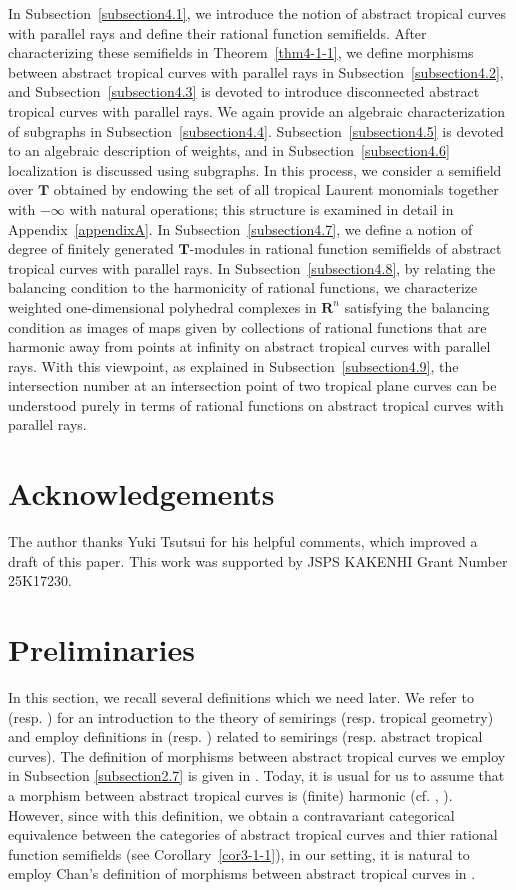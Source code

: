 \documentclass[a4paper,12pt]{amsart}
\begin{document}
In Subsection~\ref{subsection4.1}, we introduce the notion of abstract tropical curves with parallel rays and define their rational function semifields.
After characterizing these semifields in Theorem~\ref{thm4-1-1}, we define morphisms between abstract tropical curves with parallel rays in Subsection~\ref{subsection4.2}, and Subsection~\ref{subsection4.3} is devoted to introduce disconnected abstract tropical curves with parallel rays.
We again provide an algebraic characterization of subgraphs in Subsection~\ref{subsection4.4}.
Subsection~\ref{subsection4.5} is devoted to an algebraic description of weights, and in Subsection~\ref{subsection4.6} localization is discussed using subgraphs.
In this process, we consider a semifield over $\boldsymbol{T}$ obtained by endowing the set of all tropical Laurent monomials together with $-\infty$ with natural operations; this structure is examined in detail in Appendix~\ref{appendixA}.
In Subsection~\ref{subsection4.7}, we define a notion of degree of finitely generated $\boldsymbol{T}$-modules in rational function semifields of abstract tropical curves with parallel rays.
In Subsection~\ref{subsection4.8}, by relating the balancing condition to the harmonicity of rational functions, we characterize weighted one-dimensional polyhedral complexes in $\boldsymbol{R}^n$ satisfying the balancing condition as images of maps given by collections of rational functions that are harmonic away from points at infinity on abstract tropical curves with parallel rays.
With this viewpoint, as explained in Subsection~\ref{subsection4.9}, the intersection number at an intersection point of two tropical plane curves can be understood purely in terms of rational functions on abstract tropical curves with parallel rays.

\section*{Acknowledgements}
The author thanks Yuki Tsutsui for his helpful comments, which improved a draft of this paper.
This work was supported by JSPS KAKENHI Grant Number 25K17230.

\section{Preliminaries}
	\label{section2}

In this section, we recall several definitions which we need later.
We refer to \cite{Golan} (resp. \cite{Maclagan=Sturmfels}) for an introduction to the theory of semirings (resp. tropical geometry) and employ definitions in \cite{Jun} (resp. \cite{JuAe3}) related to semirings (resp. abstract tropical curves).
The definition of morphisms between abstract tropical curves we employ in Subsection \ref{subsection2.7} is given in \cite{Chan}.
Today, it is usual for us to assume that a morphism between abstract tropical curves is (finite) harmonic (cf. \cite{Chan}, \cite{JuAe3}).
However, since with this definition, we obtain a contravariant categorical equivalence between the categories of abstract tropical curves and thier rational function semifields (see Corollary~\ref{cor3-1-1}), in our setting, it is natural to employ Chan's definition of morphisms between abstract tropical curves in \cite{Chan}.
\end{document}
